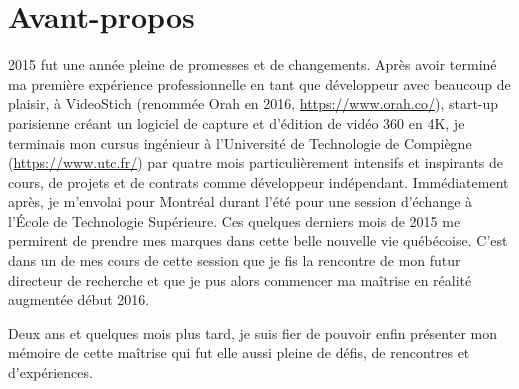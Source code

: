 \chapter*{Avant-propos}

2015 fut une année pleine de promesses et de changements. Après avoir terminé ma première expérience professionnelle en tant que développeur avec beaucoup de plaisir, à VideoStich (renommée Orah en 2016, \url{https://www.orah.co/}), start-up parisienne créant un logiciel de capture et d'édition de vidéo 360 en 4K, je terminais mon cursus ingénieur à l'Université de Technologie de Compiègne (\url{https://www.utc.fr/}) par quatre mois particulièrement intensifs et inspirants de cours, de projets et de contrats comme développeur indépendant. Immédiatement après, je m'envolai pour Montréal durant l'été pour une session d'échange à l'École de Technologie Supérieure. Ces quelques derniers mois de 2015 me permirent de prendre mes marques dans cette belle nouvelle vie québécoise. C'est dans un de mes cours de cette session que je fis la rencontre de mon futur directeur de recherche et que je pus alors commencer ma maîtrise en réalité augmentée début 2016.

Deux ans et quelques mois plus tard, je suis fier de pouvoir enfin présenter mon mémoire de cette maîtrise qui fut elle aussi pleine de défis, de rencontres et d'expériences.